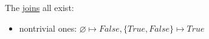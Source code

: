 The \hyperref[D1.81]{joins} all exist:
\begin{itemize}
  \item nontrivial ones: $\varnothing \mapsto False, \{True,False\}\mapsto True$
\end{itemize}